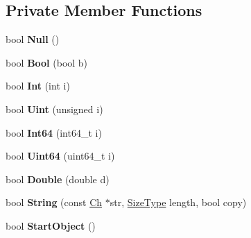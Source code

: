 \subsection*{Private Member Functions}
\begin{DoxyCompactItemize}
\item 
bool {\bfseries Null} ()\hypertarget{class_generic_document_a87dc7f66b2b92660b8a43546733f9df2}{}\label{class_generic_document_a87dc7f66b2b92660b8a43546733f9df2}

\item 
bool {\bfseries Bool} (bool b)\hypertarget{class_generic_document_a4c44780642518dd34bd241a1ea0ceaf1}{}\label{class_generic_document_a4c44780642518dd34bd241a1ea0ceaf1}

\item 
bool {\bfseries Int} (int i)\hypertarget{class_generic_document_a8cc986266becaa268474c607489745c7}{}\label{class_generic_document_a8cc986266becaa268474c607489745c7}

\item 
bool {\bfseries Uint} (unsigned i)\hypertarget{class_generic_document_a530dd899a04a00ba74f52507b488d2c1}{}\label{class_generic_document_a530dd899a04a00ba74f52507b488d2c1}

\item 
bool {\bfseries Int64} (int64\+\_\+t i)\hypertarget{class_generic_document_a934b1b7a7ed89917615a5410db77a942}{}\label{class_generic_document_a934b1b7a7ed89917615a5410db77a942}

\item 
bool {\bfseries Uint64} (uint64\+\_\+t i)\hypertarget{class_generic_document_a50ac3451a1afd0ce248dcc023d5e09e8}{}\label{class_generic_document_a50ac3451a1afd0ce248dcc023d5e09e8}

\item 
bool {\bfseries Double} (double d)\hypertarget{class_generic_document_a934bf7a5d1ff062ab079756d842e4f6b}{}\label{class_generic_document_a934bf7a5d1ff062ab079756d842e4f6b}

\item 
bool {\bfseries String} (const \hyperlink{class_generic_value_ade0e0ce64ccd5d852da57a35e720bafb}{Ch} $\ast$str, \hyperlink{rapidjson_8h_a5ed6e6e67250fadbd041127e6386dcb5}{Size\+Type} length, bool copy)\hypertarget{class_generic_document_ad319fcc9e13606b6795424b9374a7398}{}\label{class_generic_document_ad319fcc9e13606b6795424b9374a7398}

\item 
bool {\bfseries Start\+Object} ()\hypertarget{class_generic_document_abb1417fde52cc34cb340e3b50a3295da}{}\label{class_generic_document_abb1417fde52cc34cb340e3b50a3295da}


\end{DoxyCompactItemize}
